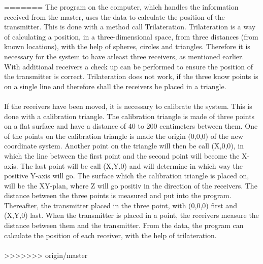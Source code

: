 =======
The program on the computer, which handles the information received from the master, uses the data to calculate the position of the transmitter. This is done with a method call Trilateration. Trilateration is a way of calculating a position, in a three-dimensional space, from three distances (from known locations), with the help of spheres, circles and triangles. Therefore it is necessary for the system to have atleast three receivers, as mentioned earlier.  With additional receivers a check up can be performed to ensure the position of the transmitter is correct. Trilateration does not work, if the three know points is on a single line and therefore shall the receivers be placed in a triangle.\\\\
\noindent
If the receivers have been moved, it is necessary to calibrate the system. This is done with a calibration triangle. The calibration triangle is made of three points on a flat surface and have a distance of 40 to 200 centimeters between them. One of the points on the calibration triangle is made the origin (0,0,0) of the new coordinate system. Another point on the triangle will then be call (X,0,0), in which the line between the first point and the second point will become the X-axis. The last point will be call (X,Y,0) and will determine in which way the positive Y-axis will go. The surface which the calibration triangle is placed on, will be the XY-plan, where Z will go positiv in the direction of the receivers. The distance between the three points is measured and put into the program. Thereafter, the transmitter placed in the three point, with (0,0,0) first and (X,Y,0) last. When the transmitter is placed in a point, the receivers measure the distance between them and the transmitter. From the data, the program can calculate the position of each receiver, with the help of trilateration. \\\\


>>>>>>> origin/master
